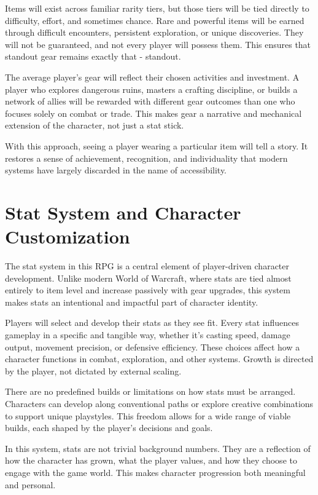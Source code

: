 Items will exist across familiar rarity tiers, but those tiers will be tied directly to difficulty, effort, and sometimes chance. Rare and powerful items will be earned through difficult encounters, persistent exploration, or unique discoveries. They will not be guaranteed, and not every player will possess them. This ensures that standout gear remains exactly that - standout.

The average player's gear will reflect their chosen activities and investment. A player who explores dangerous ruins, masters a crafting discipline, or builds a network of allies will be rewarded with different gear outcomes than one who focuses solely on combat or trade. This makes gear a narrative and mechanical extension of the character, not just a stat stick.

With this approach, seeing a player wearing a particular item will tell a story. It restores a sense of achievement, recognition, and individuality that modern systems have largely discarded in the name of accessibility.







\section{Stat System and Character Customization}

The stat system in this RPG is a central element of player-driven character development. Unlike modern World of Warcraft, where stats are tied almost entirely to item level and increase passively with gear upgrades, this system makes stats an intentional and impactful part of character identity.

Players will select and develop their stats as they see fit. Every stat influences gameplay in a specific and tangible way, whether it's casting speed, damage output, movement precision, or defensive efficiency. These choices affect how a character functions in combat, exploration, and other systems. Growth is directed by the player, not dictated by external scaling.

There are no predefined builds or limitations on how stats must be arranged. Characters can develop along conventional paths or explore creative combinations to support unique playstyles. This freedom allows for a wide range of viable builds, each shaped by the player's decisions and goals.

In this system, stats are not trivial background numbers. They are a reflection of how the character has grown, what the player values, and how they choose to engage with the game world. This makes character progression both meaningful and personal.







